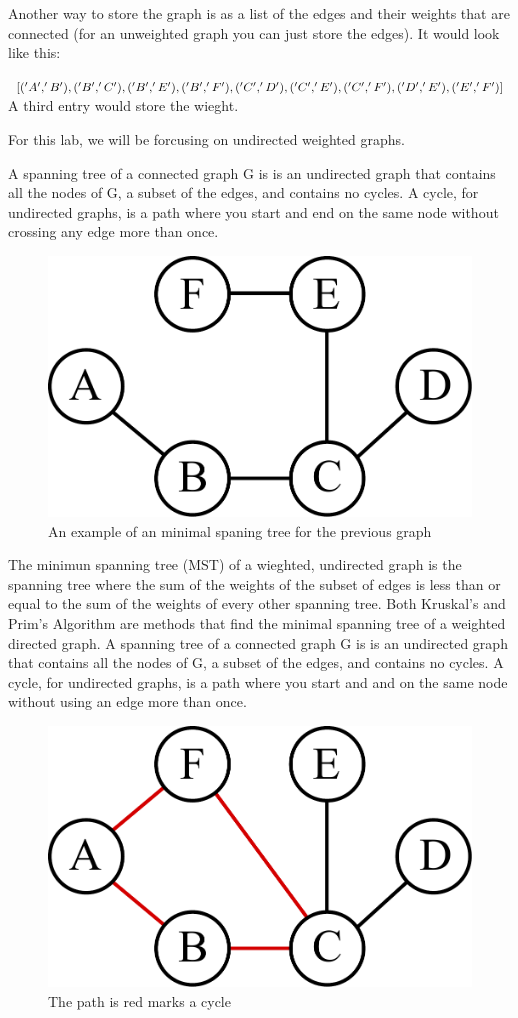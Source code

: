 Another way to store the graph is as a list of the edges and their weights that are connected (for an unweighted graph you can just store the edges).
It would look like this:

$[('A', 'B'),
 ('B', 'C'),
 ('B', 'E'),
 ('B', 'F'),
 ('C', 'D'),\\
 ('C', 'E'),
 ('C', 'F'),
 ('D', 'E'),
 ('E', 'F')]$\\
A third entry would store the wieght.

For this lab, we will be forcusing on undirected weighted graphs. 

A spanning tree of a connected graph G is is an undirected graph that contains all the nodes of G, a subset of the edges, and contains no cycles.
A cycle, for undirected graphs, is a path where you start and end on the same node without crossing any edge more than once.

\begin{figure}[H]
\includegraphics[width = .4\textwidth]{graph2.pdf}
\caption{An example of an minimal spaning tree for the previous graph}
\end{figure}

The minimun spanning tree (MST) of a wieghted, undirected graph is the spanning tree where the sum of the weights of the subset of edges is less than or equal to the sum of the weights of every other spanning tree.
Both Kruskal's and Prim's Algorithm are methods that find the minimal spanning tree of a weighted directed graph.
A spanning tree of a connected graph G is is an undirected graph that contains all the nodes of G, a subset of the edges, and contains no cycles.
A cycle, for undirected graphs, is a path where you start and and on the same node without using an edge more than once.

\begin{figure}[H]
\includegraphics[width = .4\textwidth]{graph3.pdf}
\caption{The path is red marks a cycle}
\end{figure}

